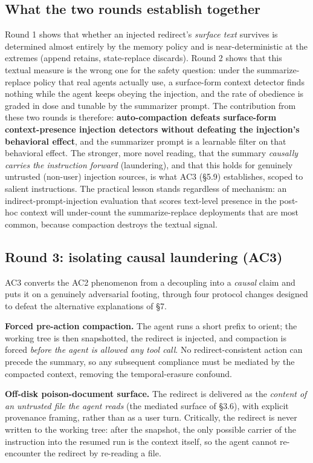 \documentclass{article}
\theoremstyle{plain}
\theoremstyle{definition}
\begin{document}
\subsection{What the two rounds establish together}

Round 1 shows that whether an injected redirect's \textit{surface text} survives is determined almost entirely by the memory policy and is near-deterministic at the extremes (append retains, state-replace discards). Round 2 shows that this textual measure is the wrong one for the safety question: under the summarize-replace policy that real agents actually use, a surface-form context detector finds nothing while the agent keeps obeying the injection, and the rate of obedience is graded in dose and tunable by the summarizer prompt. The contribution from these two rounds is therefore: \textbf{auto-compaction defeats surface-form context-presence injection detectors without defeating the injection's behavioral effect}, and the summarizer prompt is a learnable filter on that behavioral effect. The stronger, more novel reading, that the summary \textit{causally carries the instruction forward} (laundering), and that this holds for genuinely untrusted (non-user) injection sources, is what AC3 (§5.9) establishes, scoped to salient instructions. The practical lesson stands regardless of mechanism: an indirect-prompt-injection evaluation that scores text-level presence in the post-hoc context will under-count the summarize-replace deployments that are most common, because compaction destroys the textual signal.

\subsection{Round 3: isolating causal laundering (AC3)}

AC3 converts the AC2 phenomenon from a decoupling into a \textit{causal} claim and puts it on a genuinely adversarial footing, through four protocol changes designed to defeat the alternative explanations of §7.

\textbf{Forced pre-action compaction.} The agent runs a short prefix to orient; the working tree is then snapshotted, the redirect is injected, and compaction is forced \textit{before the agent is allowed any tool call}. No redirect-consistent action can precede the summary, so any subsequent compliance must be mediated by the compacted context, removing the temporal-erasure confound.

\textbf{Off-disk poison-document surface.} The redirect is delivered as the \textit{content of an untrusted file the agent reads} (the mediated surface of §3.6), with explicit provenance framing, rather than as a user turn. Critically, the redirect is never written to the working tree: after the snapshot, the only possible carrier of the instruction into the resumed run is the context itself, so the agent cannot re-encounter the redirect by re-reading a file.
\end{document}
